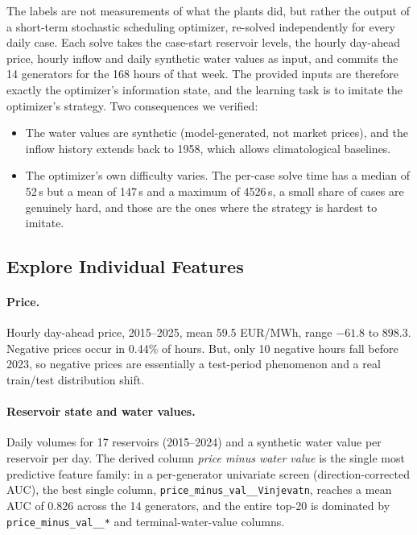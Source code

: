 \documentclass{article}
\begin{document}
The labels are not measurements of what the plants did, but rather the
output of a short-term stochastic scheduling optimizer, re-solved
independently for every daily case. Each solve takes the case-start
reservoir levels, the hourly day-ahead price, hourly inflow and daily
synthetic water values as input, and commits the 14 generators for the 168
hours of that week. The provided inputs are therefore exactly the
optimizer's information state, and the learning task is to imitate the
optimizer's strategy. Two consequences we verified:
\begin{itemize}
    \item The water values are synthetic (model-generated, not market
    prices), and the inflow history extends back to 1958, which allows
    climatological baselines.
    \item The optimizer's own difficulty varies. The per-case solve time
    has a median of 52\,s but a mean of 147\,s and a maximum of 4526\,s, a
    small share of cases are genuinely hard, and those are the ones where
    the strategy is hardest to imitate.
\end{itemize}

\subsection{Explore Individual Features}
\label{sec:individual}
\paragraph{Price.} Hourly day-ahead price, 2015--2025, mean 59.5 EUR/MWh,
range $-61.8$ to $898.3$. Negative prices occur in 0.44\% of hours. But,
only 10 negative hours fall before 2023, so negative prices are
essentially a test-period phenomenon and a real train/test distribution
shift.

\paragraph{Reservoir state and water values.} Daily volumes for 17
reservoirs (2015--2024) and a synthetic water value per reservoir per day.
The derived column \emph{price minus water value} is the single most
predictive feature family: in a per-generator univariate screen
(direction-corrected AUC), the best single column,
\texttt{price\_minus\_val\_\_Vinjevatn}, reaches a mean AUC of 0.826
across the 14 generators, and the entire top-20 is dominated by
\texttt{price\_minus\_val\_\_*} and terminal-water-value columns.
\end{document}
